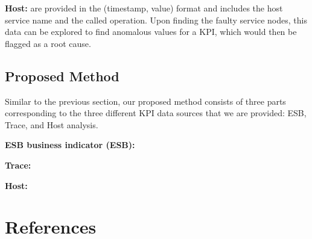 \documentclass[12pt]{article}
\begin{document}
\smallskip
\noindent \textbf{Host: }are provided in the (timestamp, value) format and includes the host service name and the called operation. Upon finding the faulty service nodes, this data can be explored to find anomalous values for a KPI, which would then be flagged as a root cause.

\vspace{-0.2cm}
\subsection{Proposed Method}
Similar to the previous section, our proposed method consists of three parts corresponding to the three different KPI data sources that we are provided: ESB, Trace, and Host analysis.

\smallskip\smallskip
\noindent \textbf{ESB business indicator (ESB): }

\smallskip
\noindent \textbf{Trace: }

\smallskip
\noindent \textbf{Host: }

\section*{References}

\begin{hangparas}{1em}{1}


\vfill %
\break

\end{hangparas}
\end{document}
